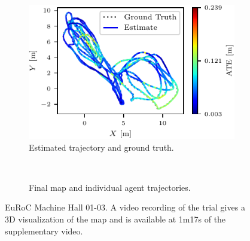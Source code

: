 \begin{figure}[h]
    \centering
    \captionsetup{format=plain}
    \begin{subfigure}[t]{0.5\linewidth}
        \centering
        \includegraphics[width=0.9\linewidth]{figures/apr11_mh_trajectory_b_trajectory.pdf}
        \caption{Estimated trajectory and ground truth.}
    \end{subfigure}\hfill%
    ~
    \begin{subfigure}[t]{0.45\linewidth}
        \centering
        \caption{Final map and individual agent trajectories.}
    \end{subfigure}

    \caption{EuRoC Machine Hall 01-03. A video recording of the trial gives a 3D visualization of the map and is available at 1m17s of the supplementary video\protect\footnotemark[1].}
    \label{fig:euroc-traj}

\end{figure}
